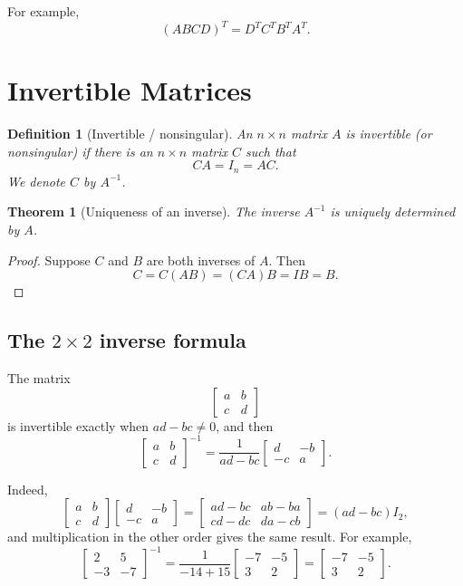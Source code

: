 \documentclass[11pt]{article}
\newtheorem*{theorem}{Theorem}
\newtheorem*{definition}{Definition}
\begin{document}
For example,
\[
(ABCD)^T=D^TC^TB^TA^T.
\]

\clearpage
\section{Invertible Matrices}

\begin{definition}[Invertible / nonsingular]
An $n\times n$ matrix $A$ is \emph{invertible} (or \emph{nonsingular}) if there is an $n\times n$ matrix $C$ such that
\[
CA=I_n=AC.
\]
We denote $C$ by $A^{-1}$.
\end{definition}

\begin{theorem}[Uniqueness of an inverse]
The inverse $A^{-1}$ is uniquely determined by $A$.
\end{theorem}

\begin{proof}
Suppose $C$ and $B$ are both inverses of $A$.  Then
\[
C=C(AB)=(CA)B=IB=B.
\]
\end{proof}

\subsection{The $2\times2$ inverse formula}
The matrix
\[
\begin{bmatrix}a&b\\c&d\end{bmatrix}
\]
is invertible exactly when $ad-bc\ne0$, and then
\[
\begin{bmatrix}a&b\\c&d\end{bmatrix}^{-1}
=\frac1{ad-bc}\begin{bmatrix}d&-b\\-c&a\end{bmatrix}.
\]

Indeed,
\[
\begin{bmatrix}a&b\\c&d\end{bmatrix}
\begin{bmatrix}d&-b\\-c&a\end{bmatrix}
=\begin{bmatrix}ad-bc&ab-ba\\cd-dc&da-cb\end{bmatrix}
=(ad-bc)I_2,
\]
and multiplication in the other order gives the same result.  For example,
\[
\begin{bmatrix}2&5\\-3&-7\end{bmatrix}^{-1}
=\frac1{-14+15}\begin{bmatrix}-7&-5\\3&2\end{bmatrix}
=\begin{bmatrix}-7&-5\\3&2\end{bmatrix}.
\]
\end{document}
